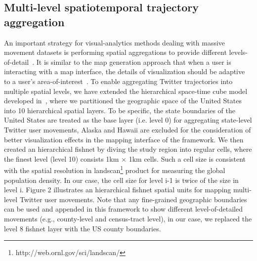 \documentclass[a4paper, 11pt]{article}
\begin{document}
\subsection{Multi-level spatiotemporal trajectory aggregation}
An important strategy for visual-analytics methods dealing with massive movement datasets is performing spatial aggregations to provide different levels-of-detail~\citep{andrienko2007designing,andrienko2007visual}.
It is similar to the map generation approach that when a user is interacting with a map interface, the details of visualization should be adaptive to a user's area-of-interest~\citep{buttenfield1991map}.
To enable aggregating Twitter trajectories into multiple spatial levels, we have extended the hierarchical space-time cube model developed in~\citep{cao2014scalable}, where we partitioned the geographic space of the United States into 10 hierarchical spatial layers. 
To be specific, the state boundaries of the United States are treated as the base layer (i.e. level 0) for aggregating state-level Twitter user movements, Alaska and Hawaii are excluded for the consideration of better visualization effects in the mapping interface of the framework. We then created an hierarchical fishnet by diving the study region into regular cells, where the finest level (level 10) consists 1km $\times$ 1km cells. Such a cell size is consistent with the spatial resolution in landscan\footnote{http://web.ornl.gov/sci/landscan/} product for measuring the global population density. In our case, the cell size for level i-1 is twice of the size in level i. Figure 2 illustrates an hierarchical fishnet spatial units for mapping multi-level Twitter user movements. Note that any fine-grained geographic boundaries can be used and appended in this framework to show different level-of-detailed movements (e.g., county-level and census-tract level), in our case, we replaced the level 8 fishnet layer with the US county boundaries.   
\end{document}

